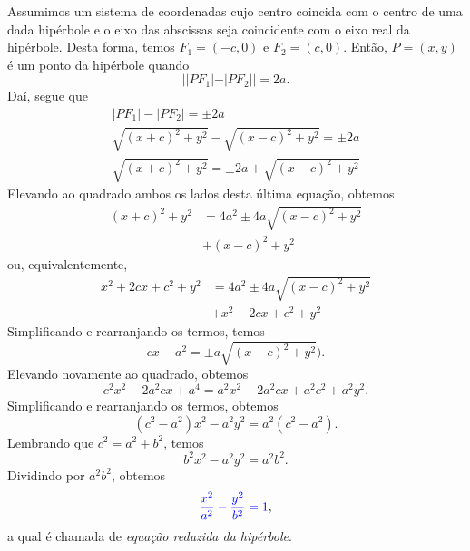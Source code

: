 Assumimos um sistema de coordenadas cujo centro coincida com o centro de uma dada hipérbole e o eixo das abscissas seja coincidente com o eixo real da hipérbole. Desta forma, temos $F_1 = (-c,0)$ e $F_2 = (c,0)$. Então, $P=(x,y)$ é um ponto da hipérbole quando
\begin{equation}
  ||PF_1|-|PF_2|| = 2a.
\end{equation}
Daí, segue que
\begin{gather}
  |PF_1|-|PF_2| = \pm 2a \\
  \sqrt{(x+c)^2+y^2}-\sqrt{(x-c)^2+y^2} =\pm 2a\\
  \sqrt{(x+c)^2+y^2} = \pm 2a + \sqrt{(x-c)^2+y^2}
\end{gather}
Elevando ao quadrado ambos os lados desta última equação, obtemos
\begin{align}
  (x+c)^2+y^2 &= 4a^2 \pm 4a\sqrt{(x-c)^2+y^2} \\
              &+ (x-c)^2+y^2
\end{align}
ou, equivalentemente,
\begin{align}
  x^2+2cx+c^2+y^2 &= 4a^2\pm4a\sqrt{(x-c)^2+y^2}\\
                  &+x^2-2cx+c^2+y^2
\end{align}
Simplificando e rearranjando os termos, temos
\begin{equation}
  cx - a^2 = \pm a\sqrt{(x-c)^2+y^2}).
\end{equation}
Elevando novamente ao quadrado, obtemos
\begin{equation}
  c^2x^2 - 2a^2cx + a^4 = a^2x^2 - 2a^2cx + a^2c^2 + a^2y^2.
\end{equation}
Simplificando e rearranjando os termos, obtemos
\begin{equation}
  (c^2-a^2)x^2 - a^2y^2 = a^2(c^2-a^2).
\end{equation}
Lembrando que $c^2 = a^2 + b^2$, temos
\begin{equation}
  b^2x^2 - a^2y^2 = a^2b^2.
\end{equation}
Dividindo por $a^2b^2$, obtemos
\begin{equation}\label{eq:hiperbole_red}
  {\color{blue}\frac{x^2}{a^2} - \frac{y^2}{b^2} = 1},
\end{equation}
a qual é chamada de \emph{equação reduzida da hipérbole}.

